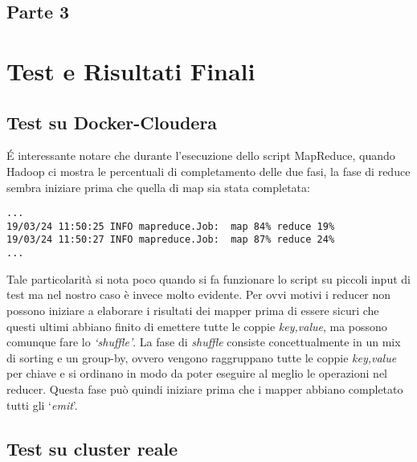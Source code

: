 \documentclass{article}
\newcommand{\MR}{MapReduce}
\begin{document}
\subsection{Parte 3}

\section{Test e Risultati Finali}
\subsection{Test su Docker-Cloudera}
\'E interessante notare che durante l'esecuzione dello script \MR{}, quando Hadoop ci mostra le percentuali di completamento delle due fasi, la fase di reduce sembra iniziare prima che quella di map sia stata completata:
\begin{verbatim}
...
19/03/24 11:50:25 INFO mapreduce.Job:  map 84% reduce 19%
19/03/24 11:50:27 INFO mapreduce.Job:  map 87% reduce 24%
...
\end{verbatim}
Tale particolarità si nota poco quando si fa funzionare lo script su piccoli input di test ma nel nostro caso è invece molto evidente. Per ovvi motivi i reducer non possono iniziare a elaborare i risultati dei mapper prima di essere sicuri che questi ultimi abbiano finito di emettere tutte le coppie \textit{\textlangle key,value\textrangle}, ma possono comunque fare lo \textit{`shuffle'}.
La fase di \textit{shuffle} consiste concettualmente in un mix di sorting e un group-by, ovvero vengono raggruppano tutte le coppie \textit{\textlangle key,value\textrangle} per chiave e si ordinano in modo da poter eseguire al meglio le operazioni nel reducer. Questa fase può quindi iniziare prima che i mapper abbiano completato tutti gli `\textit{emit}'.
\subsection{Test su cluster reale}

\end{document}
